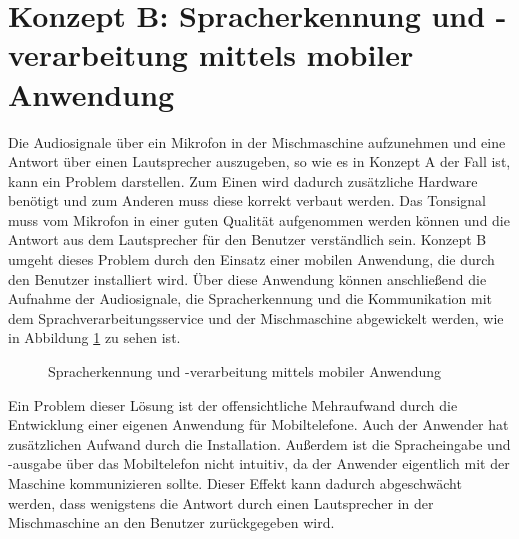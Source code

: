 \section{Konzept B: Spracherkennung und -verarbeitung mittels mobiler Anwendung}
Die Audiosignale über ein Mikrofon in der Mischmaschine aufzunehmen und eine Antwort über einen Lautsprecher auszugeben, so wie es in Konzept A der Fall ist, kann ein Problem darstellen.
Zum Einen wird dadurch zusätzliche Hardware benötigt und zum Anderen muss diese korrekt verbaut werden.
Das Tonsignal muss vom Mikrofon in einer guten Qualität aufgenommen werden können und die Antwort aus dem Lautsprecher für den Benutzer verständlich sein.
Konzept B umgeht dieses Problem durch den Einsatz einer mobilen Anwendung, die durch den Benutzer installiert wird.
Über diese Anwendung können anschließend die Aufnahme der Audiosignale, die Spracherkennung und die Kommunikation mit dem Sprachverarbeitungsservice und der Mischmaschine abgewickelt werden, wie in Abbildung \ref{figure:Konzept_mobile_App} zu sehen ist.
\begin{figure}[H]
    \centering
    \caption{\label{figure:Konzept_mobile_App}Spracherkennung und -verarbeitung mittels mobiler Anwendung}
\end{figure}
\noindent
Ein Problem dieser Lösung ist der offensichtliche Mehraufwand durch die Entwicklung einer eigenen Anwendung für Mobiltelefone.
Auch der Anwender hat zusätzlichen Aufwand durch die Installation.
Außerdem ist die Spracheingabe und -ausgabe über das Mobiltelefon nicht intuitiv, da der Anwender eigentlich mit der Maschine kommunizieren sollte.
Dieser Effekt kann dadurch abgeschwächt werden, dass wenigstens die Antwort durch einen Lautsprecher in der Mischmaschine an den Benutzer zurückgegeben wird.
